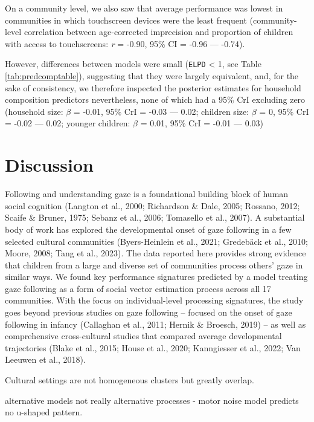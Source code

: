 \documentclass[
  man,floatsintext]{apa7}
\begin{document}
On a community level, we also saw that average performance was lowest in communities in which touchscreen devices were the least frequent (community-level correlation between age-corrected imprecision and proportion of children with access to touchscreens: \emph{r} = -0.90, 95\% CI = -0.96 --- -0.74).

However, differences between models were small (\texttt{ELPD} \textless{} 1, see Table \ref{tab:predcomptable}), suggesting that they were largely equivalent, and, for the sake of consistency, we therefore inspected the posterior estimates for household composition predictors nevertheless, none of which had a 95\% CrI excluding zero (household size: \(\beta\) = -0.01, 95\% CrI = -0.03 --- 0.02; children size: \(\beta\) = 0, 95\% CrI = -0.02 --- 0.02; younger children: \(\beta\) = 0.01, 95\% CrI = -0.01 --- 0.03)

\hypertarget{discussion}{%
\section{Discussion}\label{discussion}}

Following and understanding gaze is a foundational building block of human social cognition (Langton et al., 2000; Richardson \& Dale, 2005; Rossano, 2012; Scaife \& Bruner, 1975; Sebanz et al., 2006; Tomasello et al., 2007). A substantial body of work has explored the developmental onset of gaze following in a few selected cultural communities (Byers-Heinlein et al., 2021; Gredebäck et al., 2010; Moore, 2008; Tang et al., 2023). The data reported here provides strong evidence that children from a large and diverse set of communities process others' gaze in similar ways. We found key performance signatures predicted by a model treating gaze following as a form of social vector estimation process across all 17 communities. With the focus on individual-level processing signatures, the study goes beyond previous studies on gaze following -- focused on the onset of gaze following in infancy (Callaghan et al., 2011; Hernik \& Broesch, 2019) -- as well as comprehensive cross-cultural studies that compared average developmental trajectories (Blake et al., 2015; House et al., 2020; Kanngiesser et al., 2022; Van Leeuwen et al., 2018).

Cultural settings are not homogeneous clusters but greatly overlap.

alternative models not really alternative processes - motor noise model predicts no u-shaped pattern.
\end{document}
